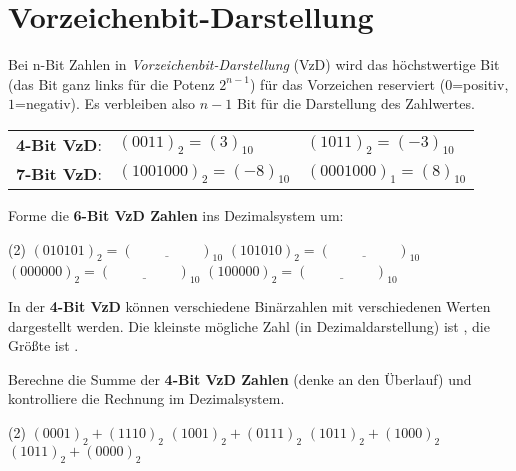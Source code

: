 \documentclass[9pt, a4paper]{arbeitsblatt}
\newcommand{\luecke}[1]{\underline{\hspace{#1}}}
\begin{document}
\ReiheTitel

\section*{Vorzeichenbit-Darstellung}
\begin{infobox}
Bei n-Bit Zahlen in \emph{Vorzeichenbit-Darstellung} (VzD) wird das höchstwertige Bit (das Bit ganz links für die Potenz $2^{n-1}$) für das Vorzeichen reserviert ($0$=positiv, $1$=negativ). Es verbleiben also $n-1$ Bit für die Darstellung des Zahlwertes.

\begin{tabularx}{\textwidth}{XXX}
	\textbf{4-Bit VzD}: & $(0011)_2 = (3)_{10}$ & $(1011)_2 = (-3)_{10}$ \\
	\textbf{7-Bit VzD}: & $(1001000)_2 = (-8)_{10}$ & $(0001000)_1 = (8)_{10}$
\end{tabularx}
\end{infobox}

\begin{aufgabe}
	Forme die \textbf{6-Bit VzD Zahlen} ins Dezimalsystem um:

	\begin{tasks}(2)
		\task $(010101)_2 = (\luecke{2cm})_{10}$
		\task $(101010)_2 = (\luecke{2cm})_{10}$
		\task $(000000)_2 = (\luecke{2cm})_{10}$
		\task $(100000)_2 = (\luecke{2cm})_{10}$
	\end{tasks}
\end{aufgabe}

\begin{aufgabe}
	In der \textbf{4-Bit VzD} können \luecke{2cm} verschiedene Binärzahlen mit \luecke{2cm} verschiedenen Werten dargestellt werden. Die kleinste mögliche Zahl (in Dezimaldarstellung) ist \luecke{2cm}, die Größte ist \luecke{2cm}.
\end{aufgabe}

\begin{aufgabe}
	Berechne die Summe der \textbf{4-Bit VzD Zahlen} (denke an den Überlauf) und kontrolliere die Rechnung im Dezimalsystem.

	\begin{tasks}(2)
		\task $(0001)_2 + (1110)_2$
		\task $(1001)_2 + (0111)_2$
		\task $(1011)_2 + (1000)_2$
		\task $(1011)_2 + (0000)_2$
	\end{tasks}
\end{aufgabe}
\end{document}

